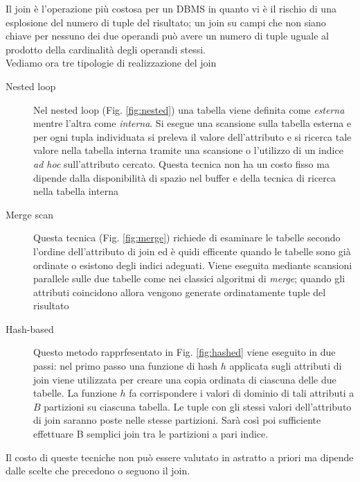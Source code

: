  Il join è l'operazione più costosa per un DBMS in quanto vi è il rischio di una esplosione del numero di tuple del risultato; un join su campi che non siano chiave per nessuno dei due operandi può avere un numero di tuple uguale al prodotto della cardinalità degli operandi stessi.\\
 Vediamo ora tre tipologie di realizzazione del join
 \begin{description}
   \item[Nested loop] Nel nested loop (Fig. \ref{fig:nested}) una tabella viene definita come \emph{esterna} mentre l'altra come \emph{interna}. Si esegue una scansione sulla tabella esterna e per ogni tupla individuata si preleva il valore dell'attributo e si ricerca tale valore nella tabella interna tramite una scansione o l'utilizzo di un indice \emph{ad hoc} sull'attributo cercato. Questa tecnica non ha un costo fisso ma dipende dalla disponibilità di spazio nel buffer e della tecnica di ricerca nella tabella interna
   \item[Merge scan] Questa tecnica (Fig. \ref{fig:merge}) richiede di esaminare le tabelle secondo l'ordine dell'attributo di join ed è quidi efficente quando le tabelle sono già ordinate o esistono degli indici adeguati. Viene eseguita mediante scansioni parallele sulle due tabelle come nei classici algoritmi di \emph{merge}; quando gli attributi coincidono allora vengono generate ordinatamente tuple del risultato
   \item[Hash-based] Questo metodo rapprfesentato in Fig. \ref{fig:hashed} viene eseguito in due passi: nel primo passo una funzione di hash $h$ applicata sugli attributi di join viene utilizzata per creare una copia ordinata di ciascuna delle due tabelle. La funzione $h$ fa corrispondere i valori di dominio di tali attributi a $B$ partizioni su ciascuna tabella. Le tuple con gli stessi valori dell'attributo di join saranno poste nelle stesse partizioni. Sarà così poi sufficiente effettuare B semplici join tra le partizioni a pari indice.
 \end{description}
 Il costo di queste tecniche non può essere valutato in astratto a priori ma dipende dalle scelte che precedono o seguono il join.
